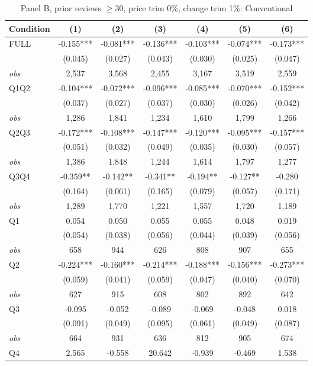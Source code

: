 \documentclass[11pt]{article}
\begin{document}
\begin{table}[!htbp]
\centering
\caption{Panel B, prior reviews $\geq 30$, price trim 0\%, change trim 1\%: Conventional}
\label{tab:b:trim01:reviews30:conventional}
\small
\begin{tabular}{lcccccc}
\toprule
Condition & (1) & (2) & (3) & (4) & (5) & (6) \\
\midrule
FULL & -0.155*** & -0.081*** & -0.136*** & -0.103*** & -0.074*** & -0.173*** \\
 & (0.045) & (0.027) & (0.043) & (0.030) & (0.025) & (0.047) \\
\textit{obs} & 2,537 & 3,568 & 2,455 & 3,167 & 3,519 & 2,559 \\
Q1Q2 & -0.104*** & -0.072*** & -0.096*** & -0.085*** & -0.070*** & -0.152*** \\
 & (0.037) & (0.027) & (0.037) & (0.030) & (0.026) & (0.042) \\
\textit{obs} & 1,286 & 1,841 & 1,234 & 1,610 & 1,799 & 1,266 \\
Q2Q3 & -0.172*** & -0.108*** & -0.147*** & -0.120*** & -0.095*** & -0.157*** \\
 & (0.051) & (0.032) & (0.049) & (0.035) & (0.030) & (0.057) \\
\textit{obs} & 1,386 & 1,848 & 1,244 & 1,614 & 1,797 & 1,277 \\
Q3Q4 & -0.359** & -0.142** & -0.341** & -0.194** & -0.127** & -0.280 \\
 & (0.164) & (0.061) & (0.165) & (0.079) & (0.057) & (0.171) \\
\textit{obs} & 1,289 & 1,770 & 1,221 & 1,557 & 1,720 & 1,189 \\
Q1 & 0.054 & 0.050 & 0.055 & 0.055 & 0.048 & 0.019 \\
 & (0.054) & (0.038) & (0.056) & (0.044) & (0.039) & (0.056) \\
\textit{obs} & 658 & 944 & 626 & 808 & 907 & 655 \\
Q2 & -0.224*** & -0.160*** & -0.214*** & -0.188*** & -0.156*** & -0.273*** \\
 & (0.059) & (0.041) & (0.059) & (0.047) & (0.040) & (0.070) \\
\textit{obs} & 627 & 915 & 608 & 802 & 892 & 642 \\
Q3 & -0.095 & -0.052 & -0.089 & -0.069 & -0.048 & 0.018 \\
 & (0.091) & (0.049) & (0.095) & (0.061) & (0.049) & (0.087) \\
\textit{obs} & 664 & 931 & 636 & 812 & 905 & 674 \\
Q4 & 2.565 & -0.558 & 20.642 & -0.939 & -0.469 & 1.538 \\

\end{tabular}
\end{table}
\end{document}
